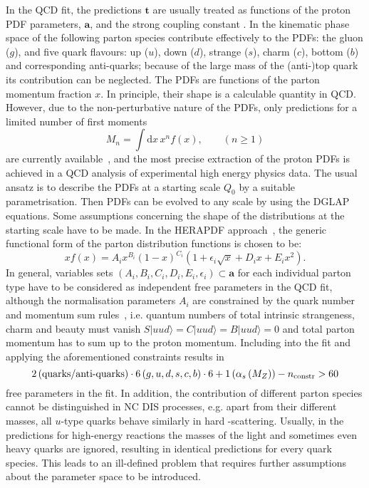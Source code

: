 In the QCD fit, the predictions $\mathbf{t}$ are usually treated as functions of the proton PDF parameters, $\mathbf{a}$, and the strong coupling constant \asz. In the kinematic phase space of \hera the following parton species contribute effectively to the PDFs: the gluon ($g$), and five quark flavours: up ($u$), down ($d$), strange ($s$), charm ($c$), bottom ($b$) and corresponding anti-quarks; because of the large mass of the (anti-)top quark its contribution can be neglected. The PDFs are functions of the parton momentum fraction $x$. In principle, their shape is a calculable quantity in QCD. However, due to the non-perturbative nature of the PDFs, only predictions for a limited number of first moments 
\begin{equation}
 M_n=\int\mathrm{d}x\,x^n f\left(x\right), \qquad (n\ge1)
\end{equation}
are currently available~\cite{Hagler:2009ni}, and the most precise extraction of the proton PDFs is achieved in a QCD analysis of experimental high energy physics data. The usual ansatz is to describe the PDFs at a starting scale $Q_0$ by a suitable parametrisation. Then PDFs can be evolved to any scale by using the DGLAP equations. Some assumptions concerning the shape of the distributions at the starting scale have to be made. In the HERAPDF approach~\cite{Aaron:2009aa}, the generic functional form of the parton distribution functions is chosen to be:
\begin{equation}
 xf\left(x\right) = A_ix^{B_i}\left(1-x\right)^{C_i}\left(1+\epsilon_i\sqrt{x}+D_ix+E_ix^2\right).
 \label{eq:pdfansatz}
\end{equation}
In general, variables sets $\left(A_i,B_i,C_i,D_i,E_i,\epsilon_i\right)\subset\mathbf{a}$ for each individual parton type have to be considered as independent free parameters in the QCD fit, although the normalisation parameters $A_i$ are constrained by the quark number and momentum sum rules~\cite{Yndurain:2006lfa}, i.e. quantum numbers of total intrinsic strangeness, charm and beauty must vanish $S|uud\rangle=C|uud\rangle=B|uud\rangle=0$ and total parton momentum has to sum up to the proton momentum. Including \asz into the fit and applying the aforementioned constraints results in 
\begin{equation}
2 \left( \text{quarks/anti-quarks}\right)\cdot 6\left(g,u,d,s,c,b\right)\cdot 6 + 1\left(\mbox{$\alpha_{s}\left(M_{Z}\right)$}\right) - n_\text{constr} > 60
\end{equation}
free parameters in the fit. In addition, the contribution of different parton species cannot be distinguished in NC DIS processes, e.g. apart from their different masses, all $u$-type quarks behave similarly in hard \ep-scattering. Usually, in the predictions for high-energy reactions the masses of the light and sometimes even heavy quarks are ignored, resulting in identical predictions for every quark species. This leads to an ill-defined problem that requires further assumptions about the parameter space to be introduced. 


